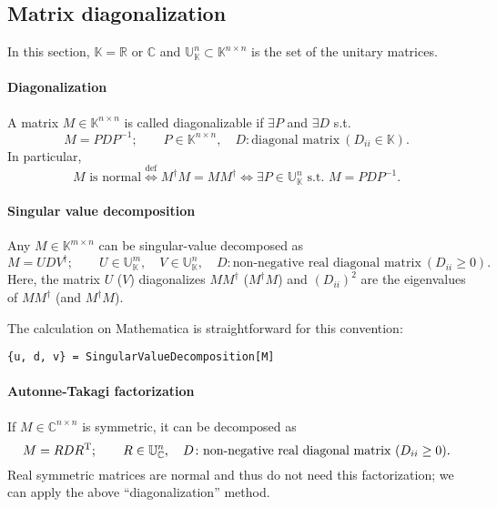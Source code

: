 \documentclass[CheatSheet]{subfiles}
\begin{document}
\subsection{Matrix diagonalization}\label{app:diagonalization}
In this section, $\mathbb K=\mathbb{R}$ or $\mathbb{C}$ and $\mathbb U_{\mathbb K}^{n}\subset \mathbb K^{n\times n}$ is the set of the unitary matrices.

\paragraph{Diagonalization}
A matrix $M\in\mathbb K^{n\times n}$ is called diagonalizable if $\exists P$ and $\exists D$ s.t.
\begin{equation}
 M=PDP^{-1};\qquad
 P\in\mathbb{K}^{n\times n},\quad
 D\colon\text{diagonal matrix}~(D_{ii}\in\mathbb{K}).
\end{equation}
In particular,
\begin{equation}
 \text{$M$ is normal} \stackrel{\text{def}}\iff M^\dagger M = M M^\dagger \iff
 \exists P\in\mathbb{U}_{\mathbb K}^{n} \text{~s.t.~} M=PDP^{-1}.
\end{equation}


\paragraph{Singular value decomposition}
Any $M\in\mathbb{K}^{m\times n}$ can be singular-value decomposed as
\begin{equation}
 M=UDV^\dagger;\qquad
 U\in\mathbb{U}_{\mathbb K}^m,\quad
 V\in\mathbb{U}_{\mathbb K}^n,\quad
 D\colon \text{non-negative real diagonal matrix}~(D_{ii}\ge0).
\end{equation}
Here, the matrix $U$ ($V$) diagonalizes $MM^\dagger$ ($M^\dagger M$) and $(D_{ii})^2$ are the eigenvalues of $MM^\dagger$ (and $M^\dagger M$).

The calculation on Mathematica is straightforward for this convention:
\begin{verbatim}
{u, d, v} = SingularValueDecomposition[M]
\end{verbatim}




\paragraph{Autonne-Takagi factorization}
If $M\in\mathbb{C}^{n\times n}$ is symmetric, it can be decomposed as
\begin{equation}
 M=RDR^{\mathrm{T}};\qquad
 R\in\mathbb{U}_{\mathbb C}^n,\quad
 D\colon \text{non-negative real diagonal matrix}~(D_{ii}\ge0).
 \label{eq:ATF}
\end{equation}
Real symmetric matrices are normal and thus do not need this factorization; we can apply the above ``diagonalization'' method.
\end{document}
